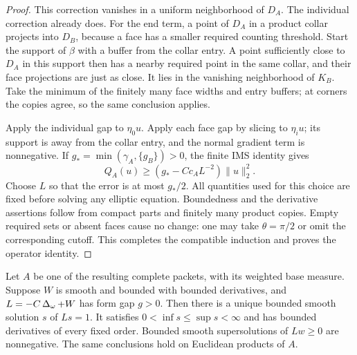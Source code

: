 \begin{proof}
This correction vanishes in a uniform neighborhood of $D_A$.  The
individual correction already does.  For the end term, a point of
$D_A$ in a product collar projects into $D_B$, because a face has a
smaller required counting threshold.  Start the support of $\beta$
with a buffer from the collar entry.  A point sufficiently close to
$D_A$ in this support then has a nearby required point in the same
collar, and their face projections are just as close.  It lies in the
vanishing neighborhood of $K_B$.  Take the minimum of the finitely
many face widths and entry buffers; at corners the copies agree, so
the same conclusion applies.

Apply the individual gap to $\eta_0u$.  Apply each face gap by slicing
to $\eta_iu$; its support is away from the collar entry, and the
normal gradient term is nonnegative.  If
$g_* =\min(\gamma_A,\{g_B\})>0$, the finite IMS identity gives
\[
 Q_A(u)\ge(g_*-Cc_A L^{-2})\|u\|_2^2.
\]
Choose $L$ so that the error is at most $g_*/2$.  All quantities used
for this choice are fixed before solving any elliptic equation.
Boundedness and the derivative assertions follow from compact parts
and finitely many product copies.  Empty required sets or absent faces
cause no change: one may take $\theta=\pi/2$ or omit the corresponding
cutoff.  This completes the compatible induction and proves the
operator identity.
\end{proof}

\begin{lemma}\label{regular:resolvent}
Let $A$ be one of the resulting complete packets, with its weighted
base measure.  Suppose $W$ is smooth and bounded with bounded
derivatives, and $L=-C\operatorname{\Delta}_\omega+W$ has form gap $g>0$.  Then
there is a unique bounded smooth solution $s$ of $Ls=1$.
It satisfies $0<\inf s\le\sup s<\infty$ and has bounded derivatives
of every fixed order.  Bounded smooth supersolutions of $Lw\ge0$ are
nonnegative.  The same conclusions hold on Euclidean products of $A$.
\end{lemma}

